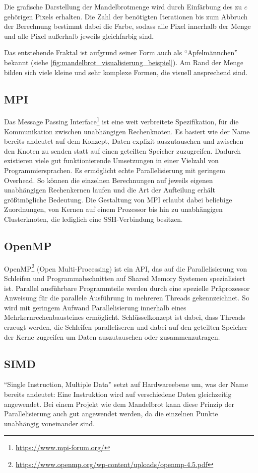 Die grafische Darstellung der Mandelbrotmenge wird durch Einfärbung des zu $c$ gehörigen Pixels erhalten.
Die Zahl der benötigten Iterationen bis zum Abbruch der Berechnung bestimmt dabei die Farbe, sodass alle Pixel
innerhalb der Menge und alle Pixel außerhalb jeweils gleichfarbig sind.

Das entstehende Fraktal ist aufgrund seiner Form auch als “Apfelmännchen” bekannt (siehe \autoref{fig:mandelbrot_visualisierung_beispiel}).
Am Rand der Menge bilden sich viele kleine und sehr komplexe Formen, die visuell ansprechend sind.

\subsection{MPI}
Das Message Passing Interface\footnote{\url{https://www.mpi-forum.org/}} ist eine weit verbreitete Spezifikation, für die Kommunikation zwischen unabhängigen Rechenknoten.
Es basiert wie der Name bereits andeutet auf dem Konzept, Daten explizit auszutauschen und zwischen den Knoten zu senden statt auf einen geteilten Speicher zuzugreifen.
Dadurch existieren viele gut funktionierende Umsetzungen in einer Vielzahl von Programmiersprachen.
Es ermöglicht echte Parallelisierung mit geringem Overhead.
So können die einzelnen Berechnungen auf jeweils eigenen unabhängigen Rechenkernen laufen und
die Art der Aufteilung erhält größtmögliche Bedeutung.
Die Gestaltung von MPI erlaubt dabei beliebige Zuordnungen, von Kernen auf einem Prozessor bis hin zu unabhängigen Clusterknoten, die lediglich eine SSH-Verbindung besitzen.

\subsection{OpenMP}

OpenMP\footnote{\url{https://www.openmp.org/wp-content/uploads/openmp-4.5.pdf}} (Open Multi-Processing) ist ein API, das auf die Parallelisierung von Schleifen und Programmabschnitten auf Shared Memory Systemen spezialisiert ist.
Parallel ausführbare Programmteile werden durch eine spezielle Präprozessor Anweisung für die parallele Ausführung in mehreren Threads gekennzeichnet.
So wird mit geringem Aufwand Parallelisierung innerhalb eines Mehrkernrechenbausteines
ermöglicht.
Schlüsselkonzept ist dabei, dass Threads erzeugt werden, die Schleifen paralleliseren und dabei auf den geteilten Speicher
der Kerne zugreifen um Daten auszutauschen oder zusammenzutragen.

\subsection{SIMD} \label{par:introduction_simd}
\enquote{Single Instruction, Multiple Data} setzt auf Hardwareebene um, was der Name bereits andeutet:
Eine Instruktion wird auf verschiedene Daten gleichzeitig angewendet.
Bei einem Projekt wie dem Mandelbrot kann diese Prinzip der Parallelisierung auch gut angewendet werden,
da die einzelnen Punkte unabhängig voneinander sind.

